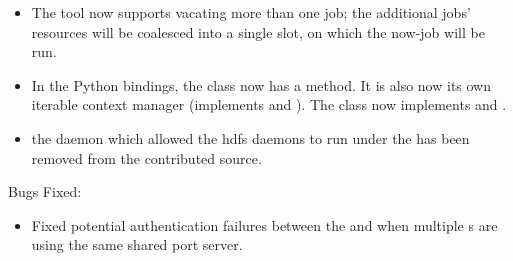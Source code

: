 \begin{itemize}
\item The  tool now supports vacating more than one job; the
additional jobs' resources will be coalesced into a single slot, on which
the now-job will be run.

\item In the Python bindings, the  class now has a
 method.  It is also now its own iterable context manager
(implements  and ).
The  class now implements  and .

\item the  daemon which allowed the hdfs daemons to run under
the  has been removed from the contributed source.

\end{itemize}

\noindent Bugs Fixed:

\begin{itemize}

\item Fixed potential authentication failures between the 
and  when multiple s are using the same
shared port server.

\end{itemize}

